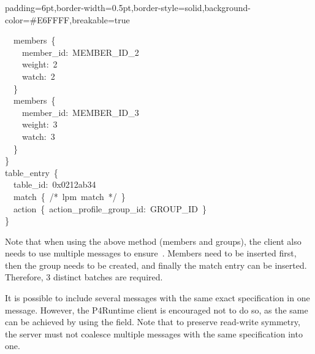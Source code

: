 \documentclass[11pt]{article}
\begin{document}
{\begin{mdbmargintb}{6pt}{6pt}
\begin{mdblock}{padding=6pt,border-width=0.5pt,border-style=solid,background-color=\#E6FFFF,breakable=true}
\begin{mdpre}
{{~~members~\{\\
~~~~member\_id:~MEMBER\_ID\_2\\
~~~~weight:~{2}\\
~~~~watch:~{2}\\
~~\}\\
~~members~\{\\
~~~~member\_id:~MEMBER\_ID\_3\\
~~~~weight:~{3}\\
~~~~watch:~{3}\\
~~\}\\
\}\\
table\_entry~\{\\
~~table\_id:~{0x0212ab34}\\
~~match~\{~/*~lpm~match~*/~\}\\
~~action~\{~action\_profile\_group\_id:~GROUP\_ID~\}\\
\}}}%
\end{mdpre}%
\end{mdblock}%
\end{mdbmargintb}%

\noindent{}Note that when using the above method (members and groups), the client also
needs to use multiple messages to ensure~. Members need to be inserted
first, then the group needs to be created, and finally the match entry can be
inserted. Therefore, 3 distinct  batches are required.%

It is possible to include several  messages with the same
exact  specification in one  message. However,
the P4Runtime client is encouraged not to do so, as the same can be achieved by
using the  field. Note that to preserve read-write symmetry, the server
must not coalesce multiple  messages with the same 
specification into one.%

}
\end{document}
